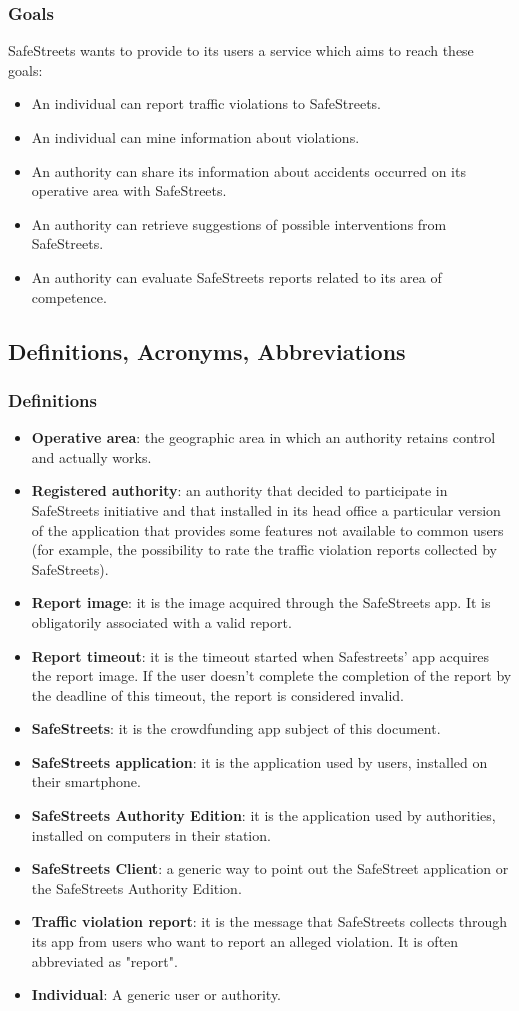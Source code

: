 \documentclass{article}
\newcommand\goal[1]{\item[{[G#1]}] }
\begin{document}
			\subsubsection{Goals}
				SafeStreets wants to provide to its users a service which aims to reach these goals:
				\begin{itemize}
					\goal{1}An individual can report traffic violations to SafeStreets.
					\goal{2}An individual can mine information about violations.					
					\goal{3}An authority can share its information about accidents occurred on its operative area with SafeStreets.
					\goal{4}An authority can retrieve suggestions of possible interventions from SafeStreets.
					\goal{5}An authority can evaluate SafeStreets reports related to its area of competence.
				\end{itemize}
				
				
		\subsection{Definitions, Acronyms, Abbreviations}
			\subsubsection{Definitions}
				\begin{itemize}
					\item \textbf{Operative area}: the geographic area in which an authority retains  control and actually works.
					\item \textbf{Registered authority}: an authority that decided to participate in SafeStreets initiative and that installed in its head office a particular version of the application that provides some features not available to common users (for example, the possibility to rate the traffic violation reports collected by SafeStreets).
					\item \textbf{Report image}: it is the image acquired through the SafeStreets app. It is obligatorily associated with a valid report.
					\item \textbf{Report timeout}: it is the timeout started when Safestreets' app acquires the report image. If the user doesn't complete the completion of the report by the deadline of this timeout, the report is considered invalid.
					\item \textbf{SafeStreets}: it is the crowdfunding app subject of this document.
					\item \textbf{SafeStreets application}: it is the application used by users, installed on their smartphone.
					\item \textbf{SafeStreets Authority Edition}: it is the application used by authorities, installed on computers in their station.
					\item \textbf{SafeStreets Client}: a generic way to point out the SafeStreet application or the SafeStreets Authority Edition.
					\item \textbf{Traffic violation report}: it is the message that SafeStreets collects through its app from users who want to report an alleged violation. It is often abbreviated as "report".
					\item \textbf{Individual}: A generic user or authority.
				\end{itemize}
\end{document}
